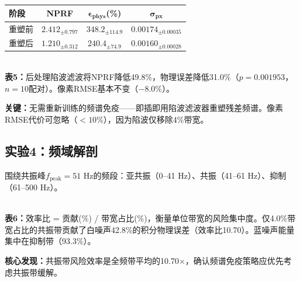 \documentclass[9pt,twocolumn]{article}
\theoremstyle{remark}
\theoremstyle{definition}
\newcommand{\physerr}{\epsilon_{\text{phys}}}
\newcommand{\澔}{%
  \hbox{%
    \scalebox{0.75}[1]{氵}%
    \kern -0.3em%
    \scalebox{0.8}[1]{皓}%
  }%
}
\begin{document}
\begin{center}
    \scriptsize\setlength{\tabcolsep}{3.5pt}
    \begin{tabular}{lccc}
        \toprule
        \textbf{阶段} & \textbf{NPRF} & $\bm{\physerr}$(\%) & $\bm{\sigma_{\text{px}}}$ \\
        \midrule
        重塑前 & $2.412_{\pm0.797}$ & $348.2_{\pm114.9}$ & $0.00174_{\pm0.00035}$ \\
        重塑后 & $\mathbf{1.210_{\pm0.312}}$ & $\mathbf{240.4_{\pm74.9}}$ & $0.00160_{\pm0.00028}$ \\
        \bottomrule
    \end{tabular}
    \\[0.5pt]
    {\scriptsize \textbf{表5：}后处理陷波滤波将NPRF降低49.8\%，物理误差降低31.0\%（$p=0.001953$，$n=10$配对）。像素RMSE基本不变（$-8.0\%$）。}
\end{center}

\textbf{关键：}无需重新训练的频谱免疫——即插即用陷波滤波器重塑残差频谱。像素RMSE代价可忽略（$<10\%$），因为陷波仅移除$4\%$带宽。

\subsection{实验4：频域解剖}

围绕共振峰$f_{\text{peak}}=51$ Hz的频段：亚共振（0--41 Hz）、共振（41--61 Hz）、抑制（61--500 Hz）。

\begin{center}
    \scriptsize
    \\[0.5pt]
    {\scriptsize \textbf{表6：}效率比 = 贡献(\%) / 带宽占比(\%)，衡量单位带宽的风险集中度。仅4.0\%带宽占比的共振带贡献了白噪声42.8\%的积分物理误差（效率比10.70）。蓝噪声能量集中在抑制带（93.3\%）。}
\end{center}

\textbf{核心发现：}共振带风险效率是全频带平均的10.70$\times$，确认频谱免疫策略应优先考虑共振带缓解。
\end{document}
